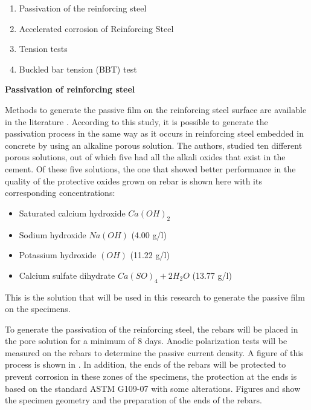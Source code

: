 \begin{enumerate}
	\item Passivation of the reinforcing steel
	\item Accelerated corrosion  of Reinforcing Steel
	\item Tension tests
	\item Buckled bar tension (BBT) test
\end{enumerate}

\textbf{Passivation of reinforcing steel}

Methods to generate the passive film on the reinforcing steel surface are available in the literature \cite{Ghods2010}. According to this study, it is possible to generate the passivation process in the same way as it occurs in reinforcing steel embedded in concrete by using an alkaline porous solution. The authors, studied ten different porous solutions, out of which five had all the alkali oxides that exist in the cement. Of these five solutions, the one that showed better performance in the quality of the protective oxides grown on rebar is shown here with its corresponding concentrations:

\begin{itemize}
	\item Saturated calcium hydroxide $Ca(OH)_2$
	\item Sodium hydroxide $Na(OH)$ (4.00 g/l)
	\item Potassium hydroxide $(OH)$ (11.22 g/l)
	\item Calcium sulfate dihydrate $Ca(SO)_4 + 2H_2O$ (13.77 g/l)
\end{itemize}

This is the solution that will be used in this research to generate the passive film on the specimens.

To generate the passivation of the reinforcing steel, the rebars will be placed in the pore solution for a minimum of 8 days. Anodic polarization tests will be measured on the rebars to determine the passive current density. A figure of this process is shown in . In addition, the ends of the rebars will be protected to prevent corrosion in these zones of the specimens, the protection at the ends is based on the standard ASTM G109-07 with some alterations. Figures  and  show the specimen geometry and the preparation of the ends of the rebars.

